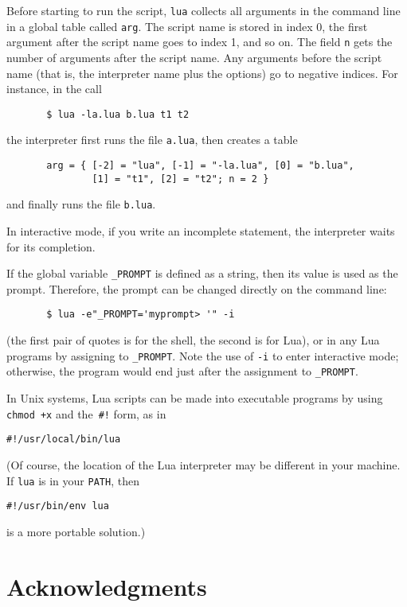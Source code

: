 \documentclass[11pt,twoside]{article}
\makeatletter
\newcommand{\T}[1]{{\tt #1}}
\newcommand{\IndexVerb}[1]{\T{#1}\index{#1@{\tt #1}}}
\newcommand{\C}[1]{}
\makeatother
\begin{document}
Before starting to run the script,
\verb|lua| collects all arguments in the command line
in a global table called \verb|arg|.
The script name is stored in index 0,
the first argument after the script name goes to index 1,
and so on.
The field \verb|n| gets the number of arguments after the script name.
Any arguments before the script name
(that is, the interpreter name plus the options)
go to negative indices.
For instance, in the call
\begin{verbatim}
       $ lua -la.lua b.lua t1 t2
\end{verbatim}
the interpreter first runs the file \T{a.lua},
then creates a table
\begin{verbatim}
       arg = { [-2] = "lua", [-1] = "-la.lua", [0] = "b.lua",
               [1] = "t1", [2] = "t2"; n = 2 }
\end{verbatim}
and finally runs the file \T{b.lua}.

In interactive mode,
if you write an incomplete statement,
the interpreter waits for its completion.

If the global variable \IndexVerb{_PROMPT} is defined as a string,
then its value is used as the prompt.
Therefore, the prompt can be changed directly on the command line:
\begin{verbatim}
       $ lua -e"_PROMPT='myprompt> '" -i
\end{verbatim}
(the first pair of quotes is for the shell,
the second is for Lua),
or in any Lua programs by assigning to \verb|_PROMPT|.
Note the use of \verb|-i| to enter interactive mode; otherwise,
the program would end just after the assignment to \verb|_PROMPT|.

In Unix systems, Lua scripts can be made into executable programs
by using \verb|chmod +x| and the~\verb|#!| form,
as in
\begin{verbatim}
#!/usr/local/bin/lua
\end{verbatim}
(Of course,
the location of the Lua interpreter may be different in your machine.
If \verb|lua| is in your \verb|PATH|,
then 
\begin{verbatim}
#!/usr/bin/env lua
\end{verbatim}
is a more portable solution.) 

\C{------------------------------------------------------------------------------}
\section*{Acknowledgments}
\end{document}
